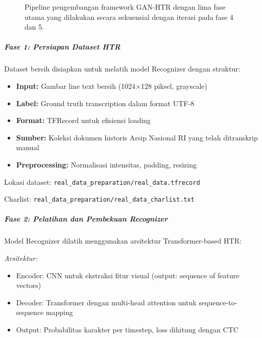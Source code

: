 \documentclass[12pt,a4paper]{article}
\begin{document}
\begin{figure}[H]
\caption{Pipeline pengembangan framework GAN-HTR dengan lima fase utama yang dilakukan secara sekuensial dengan iterasi pada fase 4 dan 5.}
\label{fig:development-pipeline}
\end{figure}

\subparagraph{Fase 1: Persiapan Dataset HTR}

Dataset bersih disiapkan untuk melatih model Recognizer dengan struktur:
\begin{itemize}[leftmargin=*, nosep]
\item \textbf{Input:} Gambar line text bersih (1024$\times$128 piksel, grayscale)
\item \textbf{Label:} Ground truth transcription dalam format UTF-8
\item \textbf{Format:} TFRecord untuk efisiensi loading
\item \textbf{Sumber:} Koleksi dokumen historis Arsip Nasional RI yang telah ditranskrip manual
\item \textbf{Preprocessing:} Normalisasi intensitas, padding, resizing
\end{itemize}

Lokasi dataset: \texttt{real\_data\_preparation/real\_data.tfrecord}

Charlist: \texttt{real\_data\_preparation/real\_data\_charlist.txt}

\subparagraph{Fase 2: Pelatihan dan Pembekuan Recognizer}

Model Recognizer dilatih menggunakan arsitektur Transformer-based HTR:

\textit{Arsitektur:}
\begin{itemize}[leftmargin=*, nosep]
\item Encoder: CNN untuk ekstraksi fitur visual (output: sequence of feature vectors)
\item Decoder: Transformer dengan multi-head attention untuk sequence-to-sequence mapping
\item Output: Probabilitas karakter per timestep, loss dihitung dengan CTC
\end{itemize}
\end{document}
